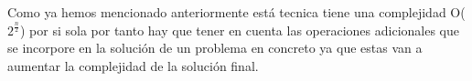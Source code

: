 Como ya hemos mencionado anteriormente está tecnica tiene una complejidad  O($2^{\frac{n}{2}}$) por si sola por tanto hay que tener en cuenta  las operaciones adicionales que se incorpore en la solución de un problema en concreto ya que estas van a aumentar la complejidad de la solución final.